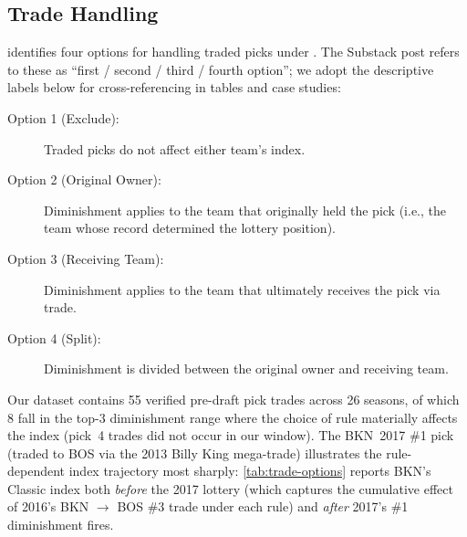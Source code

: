 \subsection{Trade Handling}
\label{sec:trade-handling}

\citet{highley2026solvable4} identifies four options for handling traded picks under \cola{}. The Substack post refers to these as ``first / second / third / fourth option''; we adopt the descriptive labels below for cross-referencing in tables and case studies:

\begin{description}
    \item[Option 1 (Exclude):] Traded picks do not affect either team's \cola{} index.
    \item[Option 2 (Original Owner):] Diminishment applies to the team that originally held the pick (i.e., the team whose record determined the lottery position).
    \item[Option 3 (Receiving Team):] Diminishment applies to the team that ultimately receives the pick via trade.
    \item[Option 4 (Split):] Diminishment is divided between the original owner and receiving team.
\end{description}


Our dataset contains 55 verified pre-draft pick trades across 26 seasons, of which 8 fall in the top-3 diminishment range where the choice of rule materially affects the index (pick~4 trades did not occur in our window). The BKN~2017 \#1 pick (traded to BOS via the 2013 Billy King mega-trade) illustrates the rule-dependent index trajectory most sharply: \cref{tab:trade-options} reports BKN's Classic \cola{} index both \emph{before} the 2017 lottery (which captures the cumulative effect of 2016's BKN $\to$ BOS \#3 trade under each rule) and \emph{after} 2017's \#1 diminishment fires.

